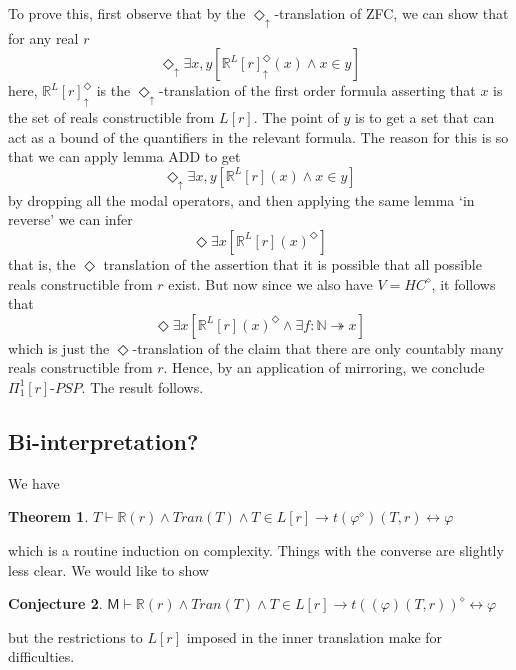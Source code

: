 \documentclass{article}
\newtheorem{Theorem}{Theorem}[section]
\theoremstyle{definition}
\newtheorem{Conjecture}[Theorem]{Conjecture}
\newcommand{\du}{\Diamond_\uparrow}
\begin{document}
To prove this, first observe that by the $\du$-translation of ZFC, we can show that for any real $r$
\begin{equation}
    \du \exists x, y[\mathbb{R}^L[r]^\du(x) \wedge x \in y]
\end{equation}
here, $\mathbb{R}^L[r]^\du$ is the $\du$-translation of the first order formula asserting that $x$ 
is the set of reals constructible from $L[r]$. The point of $y$ is to get a set that can act as a 
bound of the quantifiers in the relevant formula. The reason for this is so that we can apply lemma 
ADD to get 
\begin{equation}
    \du \exists x, y[\mathbb{R}^L[r](x) \wedge x \in y]
\end{equation}
by dropping all the modal operators, and then applying the same lemma `in reverse' we can infer
\begin{equation}
    \Diamond \exists x[\mathbb{R}^L[r](x)^\Diamond]
\end{equation}
that is, the $\Diamond$ translation of the assertion that it is possible that all possible 
reals constructible from $r$ exist. But now since we also have $V = HC^\diamond$, it follows that 
\begin{equation}
    \Diamond \exists x[\mathbb{R}^L[r](x)^\Diamond \wedge \exists f : \mathbb{N} \twoheadrightarrow x]
\end{equation}
which is just the $\Diamond$-translation of the claim that there are only countably many 
reals constructible from $r$. Hence, by an application of mirroring, we conclude $\Pi_1^1[r]$-$PSP$.
The result follows.

\subsection{Bi-interpretation?}
We have
\begin{Theorem}
    $T \vdash \mathbb{R}(r) \wedge Tran(T) \wedge T \in L[r] \rightarrow t(\varphi^\diamond)(T, r) \leftrightarrow \varphi$
\end{Theorem}
which is a routine induction on complexity. Things with the converse are slightly less clear. We would like
to show
\begin{Conjecture}
    $\mathsf{M} \vdash \mathbb{R}(r) \wedge Tran(T) \wedge T \in L[r] \rightarrow t((\varphi)(T, r))^\diamond \leftrightarrow \varphi$
\end{Conjecture}
but the restrictions to $L[r]$ imposed in the inner translation make for difficulties.
\end{document}
